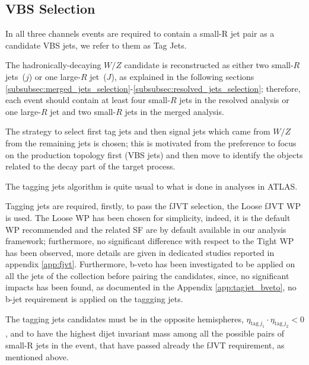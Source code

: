 \clearpage
\subsection{VBS Selection}
\label{subsec:vbs_selection}

In all three channels events are required to contain a small-R jet pair as a candidate VBS jets, we refer to them as Tag Jets. 

The hadronically-decaying $W/Z$ candidate is reconstructed as either two small-$R$ jets~($j$)
or one large-$R$ jet~($J$), as explained in the following sections \ref{subsubsec:merged_jets_selection}-\ref{subsubsec:resolved_jets_selection}; therefore, each event should contain at least four small-$R$ jets in the resolved analysis or one large-$R$ jet and
two small-$R$ jets in the merged analysis. 

The strategy to select first tag jets and then signal jets which came from $W/Z$ from the remaining jets is chosen; 
this is motivated from the preference to focus on the production topology first (VBS jets) 
and then move to identify the objects related to the decay part of the target process. 

The tagging jets algorithm is quite usual to what is done in analyses in ATLAS.

Tagging jets are required, 
firstly, 
to pass the fJVT selection, the Loose fJVT WP is used.
The Loose WP has been chosen for simplicity, indeed, it is the default WP recommended 
and the related SF are by default available in our analysis framework; 
furthermore, no significant difference with respect to the Tight WP has been observed, 
more details are given in dedicated studies reported in appendix \ref{app:fjvt}.
Furthermore, b-veto has been investigated to be applied on all the jets of the collection
before pairing the candidates, since, no significant impacts has been found,
as documented in the Appendix \ref{app:tagjet_bveto}, no b-jet requirement is applied on the taggging jets.

The tagging jets candidates must be in the opposite hemispheres, 
$\eta_{\mathrm{tag}\ j_1} \cdot \eta_{\mathrm{tag}\ j_2} < 0$,
and to have the highest dijet invariant mass among all the possible pairs of small-R jets in the event, 
that have passed already 
the fJVT requirement, as mentioned above.
 
